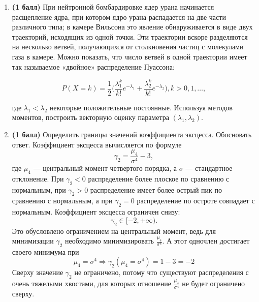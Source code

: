 \documentclass{assignment}
\begin{document}

\begin{enumerate}
    \item \textbf{(1 балл)}  При нейтронной бомбардировке ядер урана начинается расщепление ядра, при котором ядро урана распадается на две части различного типа; в камере Вильсона это явление обнаруживается в виде двух траекторий, исходящих из одной точки. Эти траектории вскоре разделяются на несколько ветвей, получающихся от столкновения частиц с молекулами газа в камере. Можно показать, что число ветвей в одной траектории имеет так называемое «двойное» распределение Пуассона:

    $$P(X = k) = \frac{1}{2}\Big(\frac{\lambda_1^k}{k!}e^{-\lambda_1} + \frac{\lambda_2^k}{k!}e^{-\lambda_2} \Big), k > 0, 1, \ldots,$$

    где $\lambda_1 < \lambda_2$ некоторые положительные постоянные. Используя методов моментов, построить векторную оценку параметра $(\lambda_1, \lambda_2)$.
    
    \item \textbf{(1 балл)} Определить границы значений коэффициента эксцесса. Обосновать ответ.
    \start
    Коэффициент эксцесса вычисляется по формуле
    \begin{equation}
        \gamma_2 = \frac{\mu_4}{\sigma^4} - 3,
    \end{equation}
    где $\mu_4$ — центральный момент четвертого порядка, а $\sigma$ — стандартное отклонение. При $\gamma_2 < 0$ распределение более плоское по сравнению с нормальным, при $\gamma_2 > 0$ распределение имеет более острый пик по сравнению с нормальным, а при $\gamma_2 = 0$ распределение по остроте совпадает с нормальным. Коэффициент эксцесса ограничен снизу:
    \begin{equation}
        \gamma_2 \in [-2, +\infty).
    \end{equation}
    Это обусловлено ограничением на центральный момент, ведь для минимизации $\gamma_2$ необходимо минимизировать $\frac{\mu_4}{\sigma^4}$. А этот одночлен достигает своего минимума при 
    \begin{equation}
        \mu_4 = \sigma^4 \Rightarrow \gamma_2(\mu_4 = \sigma^4) = 1 - 3 = - 2
    \end{equation}
    Сверху значение $\gamma_2$ не ограничено, потому что существуют распределения с очень тяжелыми хвостами, для которых отношение $\frac{\mu_4}{\sigma^4}$ не будет ограничено сверху.
    

\end{enumerate}
\end{document}
